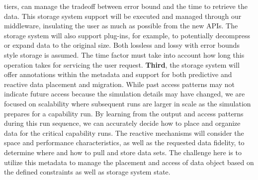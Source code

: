 \documentclass[11pt,letterpaper]{article}
\begin{document}
tiers, can manage the tradeoff between error bound and the time to
retrieve the data. This storage system support will be executed and managed through our middleware, 
insulating the user as much as possible from the new APIs. The storage system
will also support plug-ins, for example, to potentially decompress or expand data to the
original size. Both lossless and lossy with error bounds style storage is
assumed. The time factor must take into account how long this operation takes
for servicing the user request. 
%
\textbf{Third}, the storage system will offer annotations within the metadata
and support for both predictive and reactive data placement and migration.
While past access patterns may not indicate future access because the
simulation details may have changed, we are focused on scalability where
subsequent runs are larger in scale as the simulation prepares for a capability run.  By
learning from the output and access patterns during this run sequence, we can
accurately decide how to place and organize data for the critical capability
runs. The reactive mechanisms will consider the space and performance
characteristics, as well as the requested data fidelity, to determine where and
how to pull and store data sets. The challenge here is to utilize this
metadata to manage the placement and access of data object based on the
defined constraints as well as storage system state. 
\end{document}
